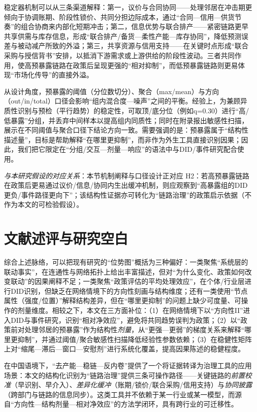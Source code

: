 稳定器机制可以从三条渠道解释：第一，议价与合同协同——处理邻居在冲击期更倾向于协调账期、阶段性锁价、共同分担边际成本，通过“合同—信用—供货节奏”的组合协商来内部化短期冲击；第二，信息优势与联合排产——紧密链路更早共享供需与库存信息，形成“联合排产/备货—柔性产能—库存协同”，降低预测误差与被动减产所致的外溢；第三，共享资源与信用支持——在关键时点形成“联合采购与授信背书”安排，以抵消下游需求或上游供给的阶段性波动。三者共同作用，使高预暴露链路在政策后呈现更强的“相对抑制”，而低预暴露链路则更易体现“市场化传导”的直接外溢。

从设计角度，预暴露的阈值（分位数切分）、聚合（max/mean）与方向（out/in/total）口径会影响“组内混合度—噪声”之间的平衡。经验上，为兼顾异质性识别与预检（平行趋势）的稳定性，可取顶/底分位（例如q=0.30）进行“高/低暴露”分组，并丢弃中间样本以提高组内同质性；同时在附录报出敏感性扫描，展示在不同阈值与聚合口径下结论方向一致。需要强调的是：预暴露属于“结构性描述量”，目标是帮助解释“在哪里更抑制”，而非作为外生工具直接识别因果；因此，我们把它限定在“分组/交互—剂量—响应”的语法中与DID/事件研究配合使用。

\noindent\textit{与本研究假设的对应关系}：本节机制阐释与口径设计正对应 H2：若高预暴露链路在政策后更易通过议价/信息/协同内生出缓冲机制，则应观察到“高暴露组的DID更负/事件路径更向下”；该结构性证据亦可转化为“链路治理”的政策启示依据（不作为本文的可检验假设）。
\section{文献述评与研究空白}
综合上述脉络，可以把现有研究的“位势图”概括为三种偏好：一类聚焦“系统层的联动事实”，在连通性与网络拓扑上给出丰富描述，但对“为什么变化、政策如何改变联动”的因果阐释不足；一类聚焦“政策评估的平均处理效应”，在个体/行业层进行DID识别，但缺乏在网络情境下的方向性刻画与结构维度；还有一类使用“节点属性（强度/位置）”解释结构差异，但在“哪里更抑制”的问题上缺少可度量、可操作的剂量维度。相较之下，本文在三方面补位：（1）在网络情境下以“方向性II”进入DID与事件研究，识别“相对净效应”，避免将共同趋势误判为政策；（2）以“政策前对处理邻居的预暴露”作为结构性\emph{剂量}，从“更强—更弱”的梯度关系来解释“哪里更抑制”，并通过阈值/聚合敏感性扫描降低经验性参数依赖；（3）在稳健性矩阵上对“缩尾—滞后—窗口—安慰剂”进行系统化覆盖，提高因果陈述的稳健程度。

在中国语境下，“去产能—稳链—反内卷”提供了一个将证据转译为治理工具的应用场景：本文的结构化识别为“链路治理”提供三条可操作路径——关键链路的\emph{前置校准}（早识别、早介入）、\emph{差异化缓冲}（账期/锁价/联合采购/信用支持）与\emph{协同披露}（跨部门与链路的信息同步）。这类工具并不依赖于某一行业或某一模型，而源自“方向性—结构剂量—相对净效应”的方法学闭环，具有跨行业的可迁移性。

